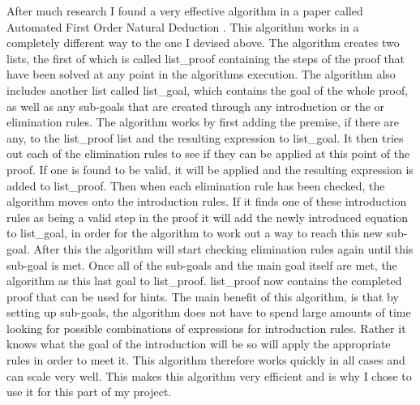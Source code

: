 After much research I found a very effective algorithm in a paper called Automated First Order Natural Deduction \cite{ndAlgo}.  This algorithm works in a completely different way to the one I devised above. The algorithm creates two lists, the first of which is called list\_proof containing the steps of the proof that have been solved at any point in the algorithms execution. The algorithm also includes another list called list\_goal, which contains the goal of the whole proof, as well as any sub-goals that are created through any introduction or the or elimination rules. The algorithm works by first adding the premise, if there are any, to the list\_proof list and the resulting expression to list\_goal. It then tries out each of the elimination rules to see if they can be applied at this point of the proof. If one is found to be valid, it will be applied and the resulting expression is added to list\_proof. Then when each elimination rule has been checked, the algorithm moves onto the introduction rules. If it finds one of these introduction rules as being a valid step in the proof it will add the newly introduced equation to list\_goal, in order for the algorithm to work out a way to reach this new sub-goal. After this the algorithm will start checking elimination rules again until this sub-goal is met. Once all of the sub-goals and the main goal itself are met, the algorithm as this last goal to list\_proof. list\_proof now contains the completed proof that can be used for hints. The main benefit of this algorithm, is that by setting up sub-goals, the algorithm does not have to spend large amounts of time looking for possible combinations of expressions for introduction rules. Rather it knows what the goal of the introduction will be so will apply the appropriate rules in order to meet it. This algorithm therefore works quickly in all cases and can scale very well. This makes this algorithm very efficient and is why I chose to use it for this part of my project. 

